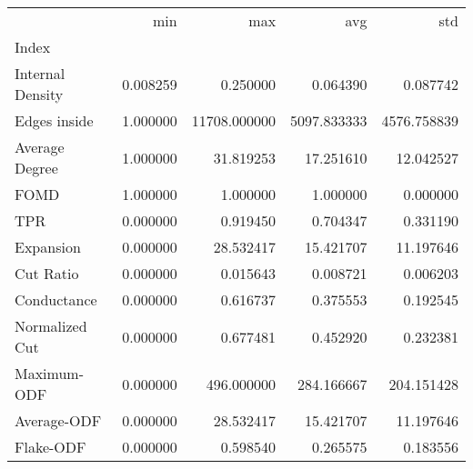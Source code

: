 \begin{tabular}{lrrrr}
\toprule
{} &       min &           max &          avg &          std \\
Index            &           &               &              &              \\
\midrule
Internal Density &  0.008259 &      0.250000 &     0.064390 &     0.087742 \\
Edges inside     &  1.000000 &  11708.000000 &  5097.833333 &  4576.758839 \\
Average Degree   &  1.000000 &     31.819253 &    17.251610 &    12.042527 \\
FOMD             &  1.000000 &      1.000000 &     1.000000 &     0.000000 \\
TPR              &  0.000000 &      0.919450 &     0.704347 &     0.331190 \\
Expansion        &  0.000000 &     28.532417 &    15.421707 &    11.197646 \\
Cut Ratio        &  0.000000 &      0.015643 &     0.008721 &     0.006203 \\
Conductance      &  0.000000 &      0.616737 &     0.375553 &     0.192545 \\
Normalized Cut   &  0.000000 &      0.677481 &     0.452920 &     0.232381 \\
Maximum-ODF      &  0.000000 &    496.000000 &   284.166667 &   204.151428 \\
Average-ODF      &  0.000000 &     28.532417 &    15.421707 &    11.197646 \\
Flake-ODF        &  0.000000 &      0.598540 &     0.265575 &     0.183556 \\
\bottomrule
\end{tabular}
